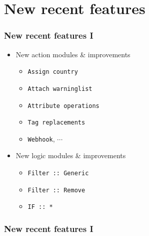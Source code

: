 \section{New recent features}
\begin{frame}
    \frametitle{New recent features I}
    \begin{itemize}
        \item New action modules \& improvements
        \begin{itemize}
            \item \texttt{Assign country}
            \item \texttt{Attach warninglist}
            \item \texttt{Attribute operations}
            \item \texttt{Tag replacements}
            \item \texttt{Webhook}, $\cdots$
        \end{itemize}
        \item New logic modules \& improvements
        \begin{itemize}
            \item \texttt{Filter :: Generic}
            \item \texttt{Filter :: Remove}
            \item \texttt{IF :: *}
        \end{itemize}
    \end{itemize}
\end{frame}

\begin{frame}
    \frametitle{New recent features I}
\end{frame}

